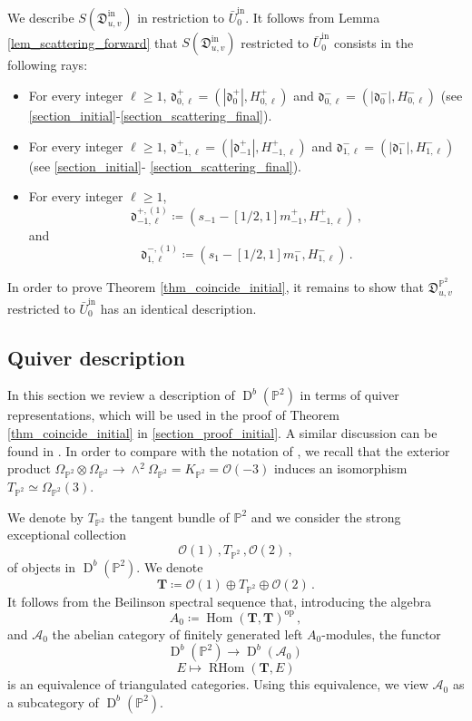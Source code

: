 \documentclass[12pt, a4paper]{amsart}
\newcommand\PP{\mathbb P}
\newcommand\cA{\mathcal A}
\newcommand\cO{\mathcal O}
\newcommand\fd{\mathfrak d}
\newcommand\fD{\mathfrak D}
\newcommand\Hom{\operatorname{Hom}}
\newcommand\D{\operatorname{D}}
\newcommand\RHom{\operatorname{RHom}}
\newcommand\iin{\mathrm{in}}
\begin{document}
We describe $S(\fD_{u,v}^\iin)$ in restriction to $\bar{U}_0^\iin$.
It follows from Lemma \ref{lem_scattering_forward} that $S(\fD_{u,v}^\iin)$
restricted to $\bar{U}_0^\iin$ consists in the following rays:
\begin{itemize}
\item[(i)] For every integer $\ell \geqslant 1$, 
$\fd_{0,\ell}^+=(|\fd_0^+|, H_{0,\ell}^+)$ and 
$\fd_{0,\ell}^-=(|\fd_0^-|, H_{0,\ell}^-)$
(see \cref{section_initial}-\cref{section_scattering_final}).
\item[(ii)] For every integer 
$\ell \geqslant 1$, 
$\fd_{-1,\ell}^+=(|\fd_{-1}^+|, H_{-1,\ell}^+)$ and 
$\fd_{1,\ell}^-=(|\fd_1^-|, H_{1,\ell}^-)$
(see \cref{section_initial}-
\cref{section_scattering_final}).
\item[(iii)] For every integer $\ell \geqslant 1$, 
\[\fd_{-1,\ell}^{+,(1)} \coloneq 
\left(s_{-1}-[1/2,1]m_{-1}^+, 
H_{-1,\ell}^+ \right)\,,\] and 
\[\fd_{1,\ell}^{-,(1)} \coloneq 
\left(s_{1}-[1/2,1]m_{1}^-, 
H_{1,\ell}^-\right)\,.\]
\end{itemize}

In order to prove 
Theorem
\ref{thm_coincide_initial},
it remains to show that 
$\fD_{u,v}^{\PP^2}$ restricted to $\bar{U}_0^{\iin}$ has an identical description.

\subsection{Quiver description}
\label{section_quiver_description}

In this section we review a description of $\D^b(\PP^2)$ in terms of quiver representations, which will be used in the
proof of Theorem \ref{thm_coincide_initial}
in \cref{section_proof_initial}. 
A similar discussion can be found in 
\cite[\S 4.3]{MR2681544}. In order to compare with the notation of \cite{MR2681544}, we recall that the exterior product 
$\Omega_{\PP^2} \otimes \Omega_{\PP^2} 
\rightarrow \wedge^2 \Omega_{\PP^2}
=K_{\PP^2}=\cO(-3)$ induces an isomorphism
$T_{\PP^2} \simeq \Omega_{\PP^2}(3)$.


We denote by $T_{\PP^2}$ the tangent bundle of 
$\PP^2$ and we consider the strong exceptional collection
\cite{MR885779} 
\[ \cO(1)\,,T_{\PP^2}\,,\cO(2) \,,\]
of objects in $\D^b(\PP^2)$.
We denote 
\[ \mathbf{T} \coloneq \cO(1)\oplus T_{\PP^2}\oplus\cO(2)\,.\]
It follows from the Beilinson spectral sequence \cite{MR509388} that, introducing the algebra
\[ A_0 \coloneq \Hom(\mathbf{T},\mathbf{T})^{\mathrm{op}}\,,\]
and $\cA_0$ the abelian category of 
finitely generated left $A_0$-modules, the 
functor 
\[ \D^b(\PP^2) \rightarrow \D^b(\cA_0)\,\]
\[ E \mapsto \RHom(\mathbf{T},E) \]
is an equivalence of triangulated categories. Using this equivalence, we view 
$\cA_0$ as a subcategory of $\D^b(\PP^2)$.
\end{document}
